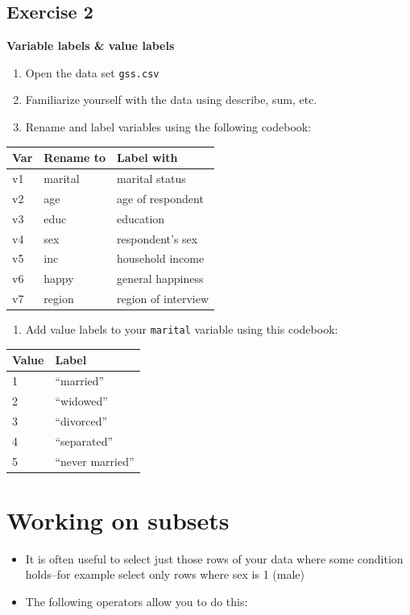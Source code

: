 \documentclass[
]{book}
\providecommand{\tightlist}{%
  \setlength{\itemsep}{0pt}\setlength{\parskip}{0pt}}
\begin{document}
\hypertarget{exercise-2-4}{%
\subsection{Exercise 2}\label{exercise-2-4}}

\textbf{Variable labels \& value labels}

\begin{enumerate}
\def\labelenumi{\arabic{enumi}.}
\tightlist
\item
  Open the data set \texttt{gss.csv}
\item
  Familiarize yourself with the data using describe, sum, etc.
\item
  Rename and label variables using the following codebook:
\end{enumerate}

\begin{longtable}[]{@{}lll@{}}
\toprule
Var & Rename to & Label with\tabularnewline
\midrule
\endhead
v1 & marital & marital status\tabularnewline
v2 & age & age of respondent\tabularnewline
v3 & educ & education\tabularnewline
v4 & sex & respondent's sex\tabularnewline
v5 & inc & household income\tabularnewline
v6 & happy & general happiness\tabularnewline
v7 & region & region of interview\tabularnewline
\bottomrule
\end{longtable}

\begin{enumerate}
\def\labelenumi{\arabic{enumi}.}
\tightlist
\item
  Add value labels to your \texttt{marital} variable using this codebook:
\end{enumerate}

\begin{longtable}[]{@{}ll@{}}
\toprule
Value & Label\tabularnewline
\midrule
\endhead
1 & ``married''\tabularnewline
2 & ``widowed''\tabularnewline
3 & ``divorced''\tabularnewline
4 & ``separated''\tabularnewline
5 & ``never married''\tabularnewline
\bottomrule
\end{longtable}

\hypertarget{working-on-subsets}{%
\section{Working on subsets}\label{working-on-subsets}}

\begin{itemize}
\tightlist
\item
  It is often useful to select just those rows of your data where some condition holds--for example select only rows where sex is 1 (male)
\item
  The following operators allow you to do this:
\end{itemize}
\end{document}
